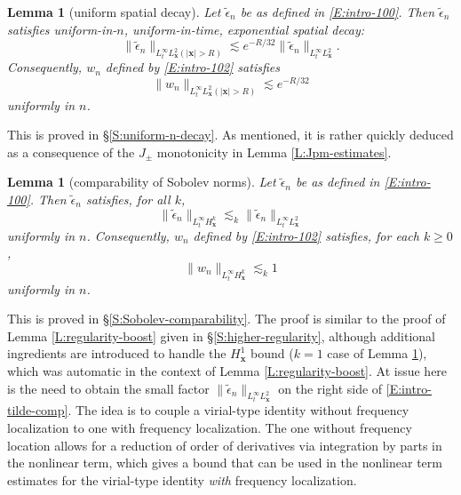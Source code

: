 \documentclass[12pt,letterpaper]{amsart}
\newtheorem{lemma}[theorem]{Lemma}
\theoremstyle{remark}
\numberwithin{equation}{section}
\numberwithin{theorem}{section}
\numberwithin{table}{section}
\begin{document}
\begin{lemma}[uniform spatial decay]
\label{L:ep-decay}
Let $\tilde \epsilon_n$ be as defined in \eqref{E:intro-100}.  Then $\tilde \epsilon_n$ satisfies uniform-in-$n$, uniform-in-time, exponential spatial decay:
$$
\| \tilde \epsilon_n \|_{L_t^\infty L_\mathbf{x}^2({|\mathbf{x}|>R})} \lesssim e^{-R/32} \| \tilde \epsilon_n \|_{L_t^\infty L_{\mathbf{x}}^2}.
$$
Consequently, $w_n$ defined by \eqref{E:intro-102} satisfies
$$
\| w_n \|_{L_t^\infty L_\mathbf{x}^2({|\mathbf{x}|>R})} \lesssim e^{-R/32} 
$$
uniformly in $n$.
\end{lemma}

This is proved in \S \ref{S:uniform-n-decay}.  As mentioned, it is rather quickly deduced as a consequence of the $J_\pm$ monotonicity in Lemma \ref{L:Jpm-estimates}.

\begin{lemma}[comparability of Sobolev norms]
\label{L:ep-comparability}
Let $\tilde \epsilon_n$ be as defined in \eqref{E:intro-100}.  Then $\tilde \epsilon_n$ satisfies, for all $k$,
\begin{equation}
\label{E:intro-tilde-comp}
\| \tilde \epsilon_n \|_{L_t^\infty H_{\mathbf{x}}^k} \lesssim_k \| \tilde \epsilon_n \|_{L_t^\infty L_{\mathbf{x}}^2}
\end{equation}
uniformly in $n$.  Consequently, $w_n$ defined by \eqref{E:intro-102} satisfies, for each $k\geq 0$,
$$
\| w_n \|_{L_t^\infty H_{\mathbf{x}}^k } \lesssim_k 1
$$
uniformly in $n$.
\end{lemma}

This is proved in \S \ref{S:Sobolev-comparability}.  The proof is similar to the proof of Lemma \ref{L:regularity-boost} given in \S\ref{S:higher-regularity}, although additional ingredients are introduced to handle the $H_{\mathbf{x}}^1$ bound ($k=1$ case of Lemma \ref{L:ep-comparability}), which was automatic in the context of Lemma \ref{L:regularity-boost}.   At issue here is the need to obtain the small factor $\| \tilde \epsilon_n \|_{L_t^\infty L_{\mathbf{x}}^2}$ on the right side of \eqref{E:intro-tilde-comp}. 
The idea is to couple a virial-type identity without frequency localization to one with frequency localization.  The one without frequency location allows for a reduction of order of derivatives via integration by parts  in the nonlinear term, which gives a bound that can be used in the nonlinear term estimates for the virial-type identity \emph{with} frequency localization. 
\end{document}
